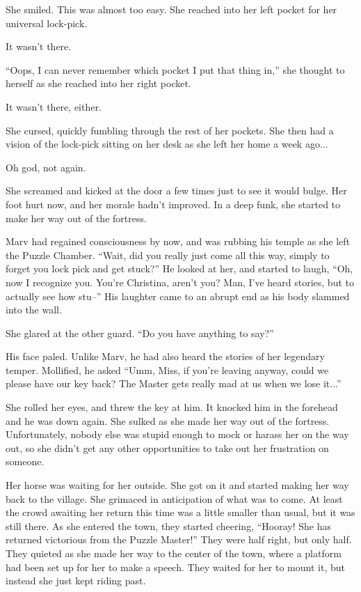 She smiled.  This was almost too easy.  She reached into her left pocket for her universal lock-pick.

It wasn’t there.

“Oops, I can never remember which pocket I put that thing in,” she thought to herself as she reached into her right pocket.

It wasn’t there, either.

She cursed, quickly fumbling through the rest of her pockets.  She then had a vision of the lock-pick sitting on her desk as she left her home a week ago...

Oh god, not again.

She screamed and kicked at the door a few times just to see it would bulge.  Her foot hurt now, and her morale hadn’t improved.  In a deep funk, she started to make her way out of the fortress.

Marv had regained consciousness by now, and was rubbing his temple as she left the Puzzle Chamber.  “Wait, did you really just come all this way, simply to forget you lock pick and get stuck?”  He looked at her, and started to laugh, “Oh, now I recognize you.  You’re Christina, aren’t you?  Man, I’ve heard stories, but to actually see how stu--” His laughter came to an abrupt end as his body slammed into the wall.

She glared at the other guard.  “Do you have anything to say?”

His face paled.  Unlike Marv, he had also heard the stories of her legendary temper.  Mollified, he asked  “Umm, Miss, if you’re leaving anyway, could we please have our key back?  The Master gets really mad at us when we lose it...”

She rolled her eyes, and threw the key at him.  It knocked him in the forehead and he was down again.
She sulked as she made her way out of the fortress.  Unfortunately, nobody else was stupid enough to mock or harass her on the way out, so she didn’t get any other opportunities to take out her frustration on someone.

Her horse was waiting for her outside.  She got on it and started making her way back to the village.  She grimaced in anticipation of what was to come.
At least the crowd awaiting her return this time was a little smaller than usual, but it was still there.  As she entered the town, they started cheering, ``Hooray!  She has returned victorious from the Puzzle Master!''    They were half right, but only half.  They quieted as she made her way to the center of the town, where a platform had been set up for her to make a speech.  They waited for her to mount it, but instead she just kept riding past.

